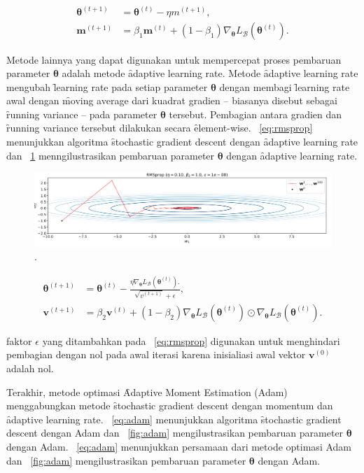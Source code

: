 \begin{align}
    \label{eq:sgd-momentum}
    \bm{\theta}^{(t+1)} &= \bm{\theta}^{(t)} - \eta m^{(t+1)}, \\
    \bm{m}^{(t+1)} &= \beta_1 \bm{m}^{(t)} + (1 - \beta_1) \nabla_{\bm{\theta}} L_{\mathcal{B}}(\bm{\theta}^{(t)}).
\end{align}


Metode lainnya yang dapat digunakan untuk mempercepat proses pembaruan parameter $\bm{\theta}$ adalah metode \f{adaptive learning rate}. Metode \f{adaptive learning rate} mengubah \f{learning rate} pada setiap parameter $\bm{\theta}$ dengan membagi \f{learning rate} awal dengan \f{moving average} dari kuadrat gradien -- biasanya disebut sebagai \f{running variance} -- pada parameter $\bm{\theta}$ tersebut. Pembagian antara gradien dan \f{running variance} tersebut dilakukan secara \f{element-wise}. \equ~\ref{eq:rmsprop} menunjukkan algoritma \f{stochastic gradient descent} dengan \f{adaptive learning rate} dan \pic~\ref{fig:rmsprop} menngilustrasikan pembaruan parameter $\bm{\theta}$ dengan \f{adaptive learning rate}.

\begin{figure}
    \centering
    \includegraphics[width=1\textwidth]{assets/pics/RMSPROP.png}
    \caption{\license.}
    \label{fig:rmsprop}
\end{figure}

\begin{align}
    \label{eq:rmsprop}
    \bm{\theta}^{(t+1)} &= \bm{\theta}^{(t)} - \frac{\eta \nabla_{\bm{\theta}} L_{\mathcal{B}}(\bm{\theta}^{(t)}).}{\sqrt{v^{(t+1)}} + \epsilon}, \\
    \bm{v}^{(t+1)} &= \beta_2 \bm{v}^{(t)} + (1 - \beta_2) \nabla_{\bm{\theta}} L_{\mathcal{B}}(\bm{\theta}^{(t)})\odot \nabla_{\bm{\theta}} L_{\mathcal{B}}(\bm{\theta}^{(t)}).
\end{align}

faktor $\epsilon$ yang ditambahkan pada \equ~\ref{eq:rmsprop} digunakan untuk menghindari pembagian dengan nol pada awal iterasi karena inisialiasi awal vektor $\bm{v}^{(0)}$ adalah nol.

Terakhir, metode optimasi \f{Adaptive Moment Estimation} (Adam) menggabungkan metode \f{stochastic gradient descent} dengan momentum dan \f{adaptive learning rate}. \equ~\ref{eq:adam} menunjukkan algoritma \f{stochastic gradient descent} dengan Adam dan \pic~\ref{fig:adam} mengilustrasikan pembaruan parameter $\bm{\theta}$ dengan Adam. \equ~\ref{eq:adam} menunjukkan persamaan dari metode optimasi Adam dan \pic~\ref{fig:adam} mengilustrasikan pembaruan parameter $\bm{\theta}$ dengan Adam.

